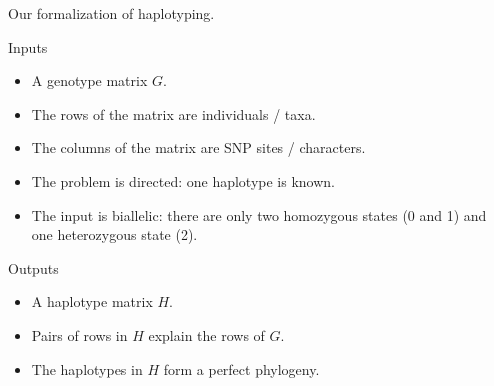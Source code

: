 \documentclass[aspectratio=1610]{beamer}
\begin{document}
\begin{frame}[t]{Our formalization of haplotyping.}
  \begin{block}{Inputs}
    \begin{itemize}
    \item A genotype matrix $G$.
    \item The rows of the matrix are individuals / taxa.
    \item The columns of the matrix are SNP sites / characters.
    \item<alert@1->
      The problem is directed: one haplotype is known.
    \item<alert@1->
      The input is biallelic: there are only two homozygous
      states (0 and 1) and one heterozygous state (2).
    \end{itemize}
  \end{block}
  \begin{block}{Outputs}
    \begin{itemize}
    \item A haplotype matrix $H$.
    \item Pairs of rows in $H$ explain the rows of $G$.
    \item<alert@1> The haplotypes in $H$ form a perfect phylogeny.
    \end{itemize}
  \end{block}
\end{frame}
\end{document}
